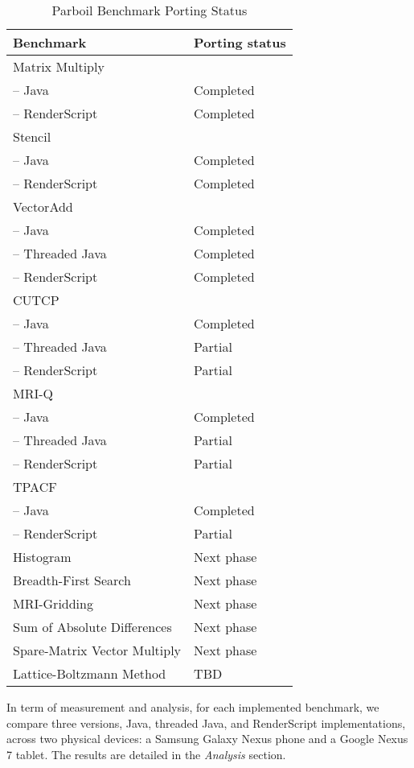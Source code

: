 \begin{table}[h]\small
\centering
\begin{tabular}{ | l | p{2cm} |}
    \hline 
    Benchmark & Porting status \\ \hline
    Matrix Multiply & \\
    \hspace{0.5cm}-- Java & Completed \\
    \hspace{0.5cm}-- RenderScript & Completed \\ \hline
    Stencil & \\
    \hspace{0.5cm}-- Java & Completed \\
    \hspace{0.5cm}-- RenderScript & Completed \\ \hline
    VectorAdd & \\
    \hspace{0.5cm}-- Java & Completed \\
    \hspace{0.5cm}-- Threaded Java & Completed \\
    \hspace{0.5cm}-- RenderScript & Completed \\ \hline
    CUTCP & \\
    \hspace{0.5cm}-- Java & Completed \\
    \hspace{0.5cm}-- Threaded Java & Partial \\
    \hspace{0.5cm}-- RenderScript & Partial \\ \hline
    MRI-Q & \\
    \hspace{0.5cm}-- Java & Completed \\
    \hspace{0.5cm}-- Threaded Java & Partial \\
    \hspace{0.5cm}-- RenderScript & Partial \\ \hline
    TPACF & \\
    \hspace{0.5cm}-- Java & Completed \\
    \hspace{0.5cm}-- RenderScript & Partial \\ \hline  
    Histogram & Next phase \\ \hline
    Breadth-First Search & Next phase\\ \hline
    MRI-Gridding & Next phase \\ \hline
    Sum of Absolute Differences & Next phase \\ \hline
    Spare-Matrix Vector Multiply & Next phase \\ \hline
    Lattice-Boltzmann Method & TBD \\ \hline
    \hline
\end{tabular}
\caption{Parboil Benchmark Porting Status}
\label{table:parboil}
\end{table}

In term of measurement and analysis, for each implemented benchmark, we compare
three versions, Java, threaded Java, and RenderScript implementations, across
two physical devices: a Samsung Galaxy Nexus phone and a Google Nexus 7 tablet.
The results are detailed in the {\em Analysis} section.

